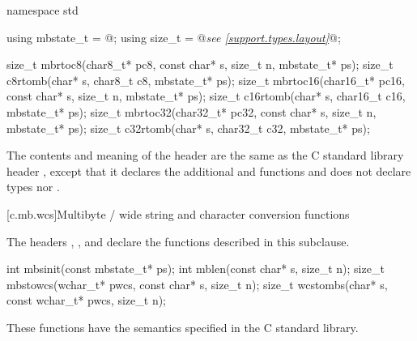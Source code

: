 %
%
%
%
%
%
%
%
%
\begin{codeblock}
namespace std {
  using mbstate_t = @\seebelow@;
  using size_t = @\textit{see \ref{support.types.layout}}@;

  size_t mbrtoc8(char8_t* pc8, const char* s, size_t n, mbstate_t* ps);
  size_t c8rtomb(char* s, char8_t c8, mbstate_t* ps);
  size_t mbrtoc16(char16_t* pc16, const char* s, size_t n, mbstate_t* ps);
  size_t c16rtomb(char* s, char16_t c16, mbstate_t* ps);
  size_t mbrtoc32(char32_t* pc32, const char* s, size_t n, mbstate_t* ps);
  size_t c32rtomb(char* s, char32_t c32, mbstate_t* ps);
}
\end{codeblock}

\pnum
{}%
The contents and meaning of the header 
are the same as the C standard library header
, except that it
declares the additional  and  functions
and does not declare types  nor .


[c.mb.wcs]{Multibyte / wide string and character conversion functions}

\pnum
{}%
%
\begin{note}
The headers ,
,
and 
declare the functions described in this subclause.
\end{note}

%
%
%
%
\begin{itemdecl}
int mbsinit(const mbstate_t* ps);
int mblen(const char* s, size_t n);
size_t mbstowcs(wchar_t* pwcs, const char* s, size_t n);
size_t wcstombs(char* s, const wchar_t* pwcs, size_t n);
\end{itemdecl}

\begin{itemdescr}
\pnum
\effects
These functions have the semantics specified in the C standard library.
\end{itemdescr}


